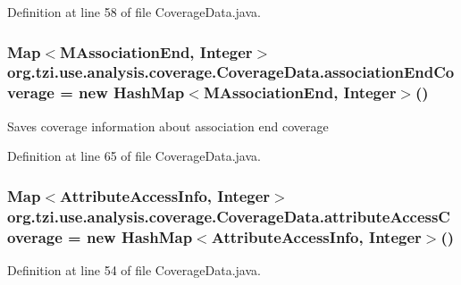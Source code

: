 Definition at line 58 of file Coverage\-Data.\-java.

\hypertarget{classorg_1_1tzi_1_1use_1_1analysis_1_1coverage_1_1_coverage_data_af50ffec81097e034e59fff02fe66e1d4}{
\subsubsection[{association\-End\-Coverage}]{\setlength{\rightskip}{0pt plus 5cm}Map$<${\bf M\-Association\-End}, Integer$>$ org.\-tzi.\-use.\-analysis.\-coverage.\-Coverage\-Data.\-association\-End\-Coverage = new Hash\-Map$<${\bf M\-Association\-End}, Integer$>$()\hspace{0.3cm}{\ttfamily [protected]}}}\label{classorg_1_1tzi_1_1use_1_1analysis_1_1coverage_1_1_coverage_data_af50ffec81097e034e59fff02fe66e1d4}
Saves coverage information about association end coverage 

Definition at line 65 of file Coverage\-Data.\-java.

\hypertarget{classorg_1_1tzi_1_1use_1_1analysis_1_1coverage_1_1_coverage_data_aae7aeb807c41253c9f0491ea2fa2f035}{
\subsubsection[{attribute\-Access\-Coverage}]{\setlength{\rightskip}{0pt plus 5cm}Map$<${\bf Attribute\-Access\-Info}, Integer$>$ org.\-tzi.\-use.\-analysis.\-coverage.\-Coverage\-Data.\-attribute\-Access\-Coverage = new Hash\-Map$<${\bf Attribute\-Access\-Info}, Integer$>$()\hspace{0.3cm}{\ttfamily [protected]}}}\label{classorg_1_1tzi_1_1use_1_1analysis_1_1coverage_1_1_coverage_data_aae7aeb807c41253c9f0491ea2fa2f035}


Definition at line 54 of file Coverage\-Data.\-java.

